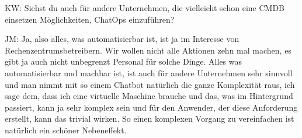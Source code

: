 \begin{list}{X:}{\setlength{\labelsep}{5mm}}
\item[KW:] Siehst du auch für andere Unternehmen, die vielleicht schon eine CMDB einsetzen Möglichkeiten, ChatOps einzuführen?
\item[JM:] Ja, also alles, was automatisierbar ist, ist ja im Interesse von Rechenzentrumsbetreibern. Wir wollen nicht alle Aktionen zehn mal machen, es gibt ja auch nicht unbegrenzt Personal für solche Dinge. Alles was automatisierbar und machbar ist, ist auch für andere Unternehmen sehr sinnvoll und man nimmt mit so einem Chatbot natürlich die ganze Komplexität raus, ich sage dem, dass ich eine virtuelle Maschine brauche und das, was im Hintergrund passiert, kann ja sehr komplex sein und für den Anwender, der diese Anforderung erstellt, kann das trivial wirken. So einen komplexen Vorgang zu vereinfachen ist natürlich ein schöner Nebeneffekt.
\end{list}

